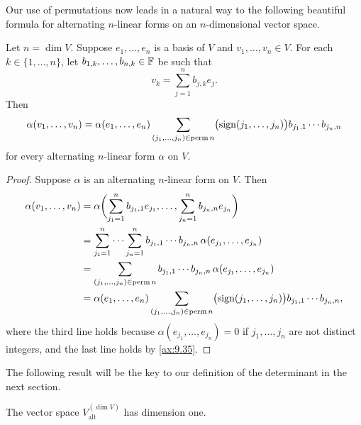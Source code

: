 Our use of permutations now leads in a natural way to the following beautiful
formula for alternating $n$-linear forms on an $n$-dimensional vector space.

\begin{result}\label{ax:9.36}
Let $n=\dim V$. Suppose $e_1,\dots,\allowbreak e_n$ is a basis of $V$ and
$v_1,\dots,v_n\in V$. For each $k\in\{1,\dots,n\}$, let
$b_{1,k},\dots,b_{n,k}\in\mathbb{F}$ be such that
\[ v_k = \sum_{j=1}^n b_{j,k}e_j. \]
Then
\[ \alpha(v_1,\dots,v_n) = \alpha(e_1,\dots,e_n)
   \sum_{(j_1,\dots,j_n)\in\operatorname{perm} n}
   \bigl(\operatorname{sign}(j_1,\dots,j_n)\bigr)b_{j_1,1}\cdots b_{j_n,n} \]
for every alternating $n$-linear form $\alpha$ on $V$.
\end{result}

\begin{proof}
Suppose $\alpha$ is an alternating $n$-linear form on $V$. Then
\begin{align*}
\alpha(v_1,\dots,v_n)
  &= \alpha\biggl(\sum_{j_1=1}^n b_{j_1,1}e_{j_1},\dots,
     \sum_{j_n=1}^n b_{j_n,n}e_{j_n}\biggr)\\
  &= \sum_{j_1=1}^n\cdots\sum_{j_n=1}^n b_{j_1,1}\cdots b_{j_n,n}\,
     \alpha(e_{j_1},\dots,e_{j_n})\\
  &= \sum_{(j_1,\dots,j_n)\in\operatorname{perm} n} b_{j_1,1}\cdots b_{j_n,n}\,
     \alpha(e_{j_1},\dots,e_{j_n})\\
  &= \alpha(e_1,\dots,e_n)\sum_{(j_1,\dots,j_n)\in\operatorname{perm} n}
     \bigl(\operatorname{sign}(j_1,\dots,j_n)\bigr)b_{j_1,1}\cdots b_{j_n,n},
\end{align*}
where the third line holds because $\alpha(e_{j_1},\dots,e_{j_n})=0$ if
$j_1,\dots,j_n$ are not distinct integers, and the last line holds by
\ref{ax:9.35}.
\end{proof}

The following result will be the key to our definition of the determinant in
the next section.

\begin{result}[$\dim V_{\mathrm{alt}}^{(\dim V)}=1$]\label{ax:9.37}
The vector space $V_{\mathrm{alt}}^{(\dim V)}$ has dimension one.
\end{result}

